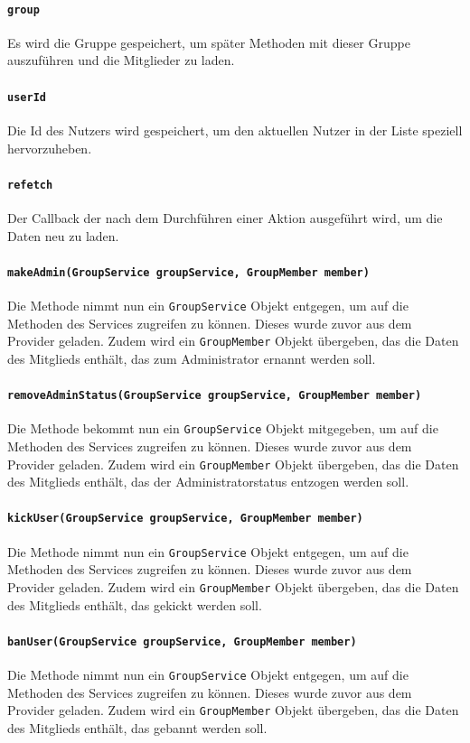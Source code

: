 \documentclass{implementierungsheft}
\begin{document}
\paragraph{\texttt{group}}
Es wird die Gruppe gespeichert, um später Methoden mit dieser Gruppe auszuführen und die Mitglieder zu laden.
\paragraph{\texttt{userId}}
Die Id des Nutzers wird gespeichert, um den aktuellen Nutzer in der Liste speziell hervorzuheben.
\paragraph{\texttt{refetch}}
Der Callback der nach dem Durchführen einer Aktion ausgeführt wird, um die Daten neu zu laden.
\paragraph{\texttt{makeAdmin(GroupService groupService, GroupMember member)}}
Die Methode nimmt nun ein \texttt{GroupService} Objekt entgegen, um auf die Methoden des Services zugreifen zu können. Dieses wurde zuvor aus dem Provider geladen. Zudem wird ein \texttt{GroupMember} Objekt übergeben, das die Daten des Mitglieds enthält, das zum Administrator ernannt werden soll.
\paragraph{\texttt{removeAdminStatus(GroupService groupService, GroupMember member)}}
Die Methode bekommt nun ein \texttt{GroupService} Objekt mitgegeben, um auf die Methoden des Services zugreifen zu können. Dieses wurde zuvor aus dem Provider geladen. Zudem wird ein \texttt{GroupMember} Objekt übergeben, das die Daten des Mitglieds enthält, das der Administratorstatus entzogen werden soll.
\paragraph{\texttt{kickUser(GroupService groupService, GroupMember member)}}
Die Methode nimmt nun ein \texttt{GroupService} Objekt entgegen, um auf die Methoden des Services zugreifen zu können. Dieses wurde zuvor aus dem Provider geladen. Zudem wird ein \texttt{GroupMember} Objekt übergeben, das die Daten des Mitglieds enthält, das gekickt werden soll.
\paragraph{\texttt{banUser(GroupService groupService, GroupMember member)}}
Die Methode nimmt nun ein \texttt{GroupService} Objekt entgegen, um auf die Methoden des Services zugreifen zu können. Dieses wurde zuvor aus dem Provider geladen. Zudem wird ein \texttt{GroupMember} Objekt übergeben, das die Daten des Mitglieds enthält, das gebannt werden soll.
\end{document}
